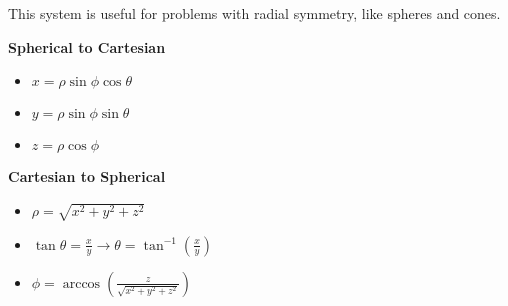 \documentclass[10pt]{article}                               %
\begin{document}
\begin{tcolorbox}
\begin{adjustwidth}{2em}{0pt}
\begin{adjustwidth}{2em}{0pt}
\begin{tcolorbox}[enhanced, colback=white, colframe=black, boxrule=0.5pt]
                This system is useful for problems with radial symmetry, like spheres and cones.

            \end{tcolorbox}

            \vspace{0.5em}

            \textbf{Spherical to Cartesian}

                \begin{itemize}
                    \item \( x = \rho\sin\phi\cos\theta \)
                    \item \( y = \rho\sin\phi\sin\theta \)
                    \item \( z = \rho\cos\phi \)
                \end{itemize}

                \vspace{0.5em}

                \textbf{Cartesian to Spherical}

                \begin{itemize}
                    \item \( \rho = \sqrt{x^2 + y^2 + z^2} \)
                    \item \( \tan\theta = \frac{x}{y}  \rightarrow  \theta = \tan^{-1}\left(\frac{x}{y}\right) \)
                    \item \( \phi = \arccos\left(\frac{z}{\sqrt{x^2 + y^2 + z^2}}\right) \)
                \end{itemize}

        \end{adjustwidth}

    \end{adjustwidth}

\end{tcolorbox}
\end{document}
